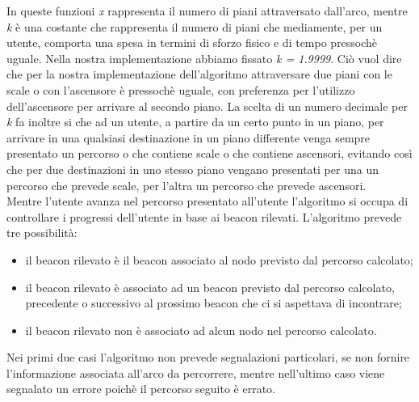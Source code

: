 \documentclass[../SperimentazioniPratiche.tex]{subfiles}
\begin{document}
		In queste funzioni \textit{x} rappresenta il numero di piani attraversato dall'arco, mentre \textit{k} è una costante che rappresenta il numero di piani che mediamente, per un utente, comporta una spesa in termini di sforzo fisico e di tempo pressochè uguale. Nella nostra implementazione abbiamo fissato \textit{k = 1.9999}. Ciò vuol dire che per la nostra implementazione dell'algoritmo attraversare due piani con le scale o con l'ascensore è pressochè uguale, con preferenza per l'utilizzo dell'ascensore per arrivare al secondo piano.
		La scelta di un numero decimale per \textit{k} fa inoltre si che ad un utente, a partire da un certo punto in un piano, per arrivare in una qualsiasi destinazione in un piano differente venga sempre presentato un percorso o che contiene scale o che contiene ascensori, evitando così che per due destinazioni in uno stesso piano vengano presentati per una un percorso che prevede scale, per l'altra un percorso che prevede ascensori. \\
		Mentre l'utente avanza nel percorso presentato all'utente l'algoritmo si occupa di controllare i progressi dell'utente in base ai beacon rilevati. L'algoritmo prevede tre possibilità:
		\begin{itemize}
			\item il beacon rilevato è il beacon associato al nodo previsto dal percorso calcolato;
			\item il beacon rilevato è associato ad un beacon previsto dal percorso calcolato, precedente o successivo al prossimo beacon che ci si aspettava di incontrare;
			\item il beacon rilevato non è associato ad alcun nodo nel percorso calcolato.
		\end{itemize}
		Nei primi due casi l'algoritmo non prevede segnalazioni particolari, se non fornire l'informazione associata all'arco da percorrere, mentre nell'ultimo caso viene segnalato un errore poichè il percorso seguito è errato.
\end{document}
